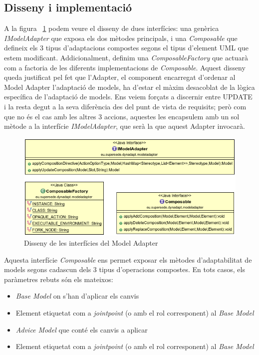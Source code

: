 \subsection{Disseny i implementació}

A la figura ~\ref{fig:Figura28} podem veure el disseny de dues interfícies: una genèrica \textit{IModelAdapter} que exposa els dos mètodes principals, i una \textit{Composable} que defineix els 3 tipus d'adaptacions compostes segons el tipus d'element UML que estem modificant. Addicionalment, definim una \textit{ComposableFactory} que actuarà com a factoria de les diferents implementacions de \textit{Composable}. Aquest disseny queda justificat pel fet que l'Adapter, el component encarregat d'ordenar al Model Adapter l'adaptació de models, ha d'estar el màxim desacoblat de la lògica específica de l'adaptació de models. Ens veiem forçats a discernir entre UPDATE i la resta degut a la seva diferència des del punt de vista de requisits; però com que no és el cas amb les altres 3 accions, aquestes les encapsulem amb un sol mètode a la interfície \textit{IModelAdapter}, que serà la que aquest Adapter invocarà.\\

\begin{figure}
\centering
\includegraphics[width=13cm]{Figures/Figure28}
\decoRule
\caption{Disseny de les interfícies del Model Adapter}
\label{fig:Figura28}
\end{figure}

Aquesta interfície \textit{Composable} ens permet exposar els mètodes d'adaptabilitat de models segons cadascun dels 3 tipus d'operacions compostes. En tots casos, els paràmetres rebuts són els mateixos:

\begin{itemize}
\item \textit{Base Model} on s'han d'aplicar els canvis
\item Element etiquetat com a \textit{jointpoint} (o amb el rol corresponent) al \textit{Base Model}
\item \textit{Advice Model} que conté els canvis a aplicar
\item Element etiquetat com a \textit{jointpoint} (o amb el rol corresponent) al \textit{Base Model}
\end{itemize}


